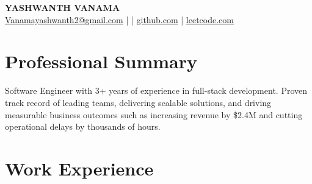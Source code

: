 \documentclass[a4paper,11pt]{article}
\begin{document}
\pagestyle{empty}

\begin{center}
    {\Huge \textbf{YASHWANTH VANAMA}} \\
    \vspace{1pt}
    \href{mailto:Vanamayashwanth2@gmail.com}{Vanamayashwanth2@gmail.com} \quad |  \quad | \quad
    \href{https://github.com/yashwanthvanama}{github.com} \quad | \quad
    \href{https://leetcode.com/u/yashwanthvanama/}{leetcode.com}
\end{center}

\vspace{2pt}

\section*{Professional Summary}
Software Engineer with 3+ years of experience in full-stack development. Proven track record of leading teams, delivering scalable solutions, and driving measurable business outcomes such as increasing revenue by \$2.4M and cutting operational delays by thousands of hours.

\section*{Work Experience}
\end{document}
